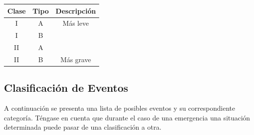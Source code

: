 
\begin{center}
\begin{tabular}{|c|c|c|}
\hline
\textbf{Clase} & \textbf{Tipo} & \textbf{Descripción} \\
\hline
I & A & Más leve \\
I & B & \\
II & A & \\
II & B & Más grave \\
\hline
\end{tabular}

\bigskip
\end{center}

\subsection*{Clasificación de Eventos}


A continuación se presenta una lista de posibles eventos y su correspondiente categoría. Téngase en cuenta que durante el caso de una emergencia una situación determinada puede pasar de una clasificación a otra.
